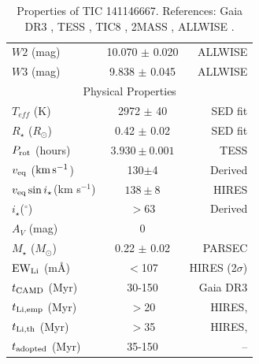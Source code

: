 \documentclass{nature3}
\newcommand{\starname}{TIC 141146667}
\newcommand{\kms}{\ensuremath{\rm km\,s^{-1}}}
\begin{document}
\begin{methods}
\begin{table}
\begin{tabular}{lcr}
    $W2$ (mag)                      & 10.070 $\pm$ 0.020 & ALLWISE   \\
    $W3$ (mag)                      &  9.838 $\pm$ 0.045 & ALLWISE   \\
    \hline
    \multicolumn{3}{c}{Physical Properties} \\
    \hline
    $T_{eff}$ (K) & 2972 $\pm$ 40 & \cite{Bouma2024} SED fit\\
    $R_\star$ ($R_{\odot}$) & 0.42 $\pm$ 0.02 & \cite{Bouma2024} SED fit \\
    $P_{\rm rot}$ (hours) & $3.930\pm 0.001$ & TESS \\ 
    $v_{\rm eq}$ (\kms)  &  130$\pm$4  & Derived \\
    $v_{\rm eq} \sin i_\star$(km s$^{-1}$) & $138 \pm 8$ & HIRES \\
    $i_\star$($^\circ$) & $>$63 & Derived \\
    $A_V$ (mag) & 0 & \cite{Green2019} \\
    $M_\star$ ($M_{\odot}$)  & 0.22 $\pm$ 0.02  & PARSEC \cite{Chen2014}\\
    ${\rm EW}_{\rm Li}$ (m\AA) & $<$107 & HIRES (2$\sigma$)\\
    $t_{\rm CAMD}$ (Myr) & 30-150 &  Gaia DR3 \\
    $t_{\rm Li,emp}$ (Myr) & $>$20 &  HIRES, \cite{Jeffries2023} \\
    $t_{\rm Li,th}$ (Myr) & $>$35 &  HIRES, \cite{Feiden2016} \\
    $t_{\rm adopted}$ (Myr) & 35-150 &  -- \\
    \hline
    \end{tabular}
		\caption{Properties of \starname.  References:
    Gaia DR3 \cite{GaiaDR3}, TESS \cite{Ricker2015},
    TIC8 \cite{Stassun2019}, 2MASS \cite{Skrutskie2006}, ALLWISE
    \cite{Cutri2014}.}
    \label{tab:stparams}
\end{table}



\end{methods}
\end{document}
